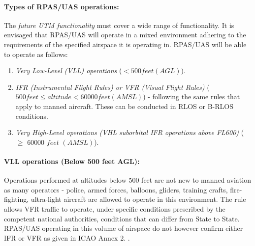 \paragraph{Types of RPAS/UAS operations:} The \emph{future UTM functionality} must cover a wide range of functionality. It is envisaged that RPAS/UAS will operate in a mixed environment adhering to the requirements of the specified airspace it is operating in. RPAS/UAS will be able to operate as follows:

\begin{enumerate}
    \item \emph{Very Low-Level (VLL) operations} ($<500 feet (AGL)$).
    
    \item  \emph{IFR (Instrumental Flight Rules) or VFR (Visual Flight Rules)} ($500 feet \le altitude < 60 000 feet (AMSL)$) - following the same rules that apply to manned aircraft. These can be conducted in RLOS or B-RLOS conditions.
    
    \item  \emph{Very High-Level operations (VHL suborbital IFR operations above FL600)} ($\ge$ $60 000$ $feet$ $(AMSL)$).
\end{enumerate}

\paragraph{VLL operations (Below 500 feet AGL):} Operations performed at altitudes below 500 feet are not new to manned aviation as many operators - police, armed forces, balloons, gliders, training crafts, fire-fighting, ultra-light aircraft are allowed to operate in this environment. The rule allows VFR traffic to operate, under specific conditions prescribed by the competent national authorities, conditions that can differ from State to State. RPAS/UAS operating in this volume of airspace do not however confirm either IFR or VFR as given in ICAO Annex 2. \cite{icaoAnnex2}.

